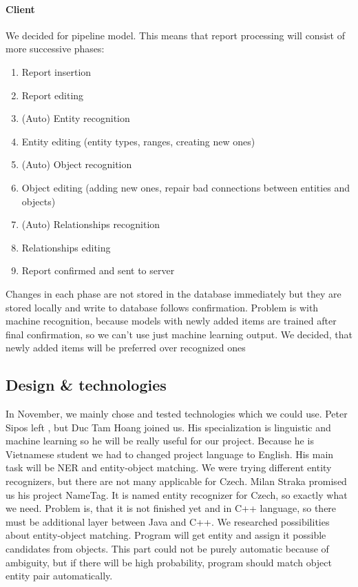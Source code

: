\paragraph{Client}
We decided for pipeline model. This means that report processing will consist of more successive phases:

\begin{enumerate}
\item Report insertion
\item Report editing
\item (Auto) Entity recognition
\item Entity editing (entity types, ranges, creating new ones)
\item (Auto) Object recognition
\item Object editing (adding new ones, repair bad connections between entities and objects)
\item (Auto) Relationships recognition
\item Relationships editing
\item Report confirmed and sent to server
\end{enumerate}

Changes in each phase are not stored in the database immediately but they are
stored locally and write to database follows confirmation. Problem is with
machine recognition, because models with newly added items are trained after final confirmation, so we can't use just machine learning output. We decided, that newly added items will be preferred over recognized ones
 
\subsection{Design \& technologies}
In November, we mainly chose and tested technologies which we could use. Peter
Sipos left \textan{}, but Duc Tam Hoang joined us. His specialization is
linguistic and machine learning so he will be really useful for our project.
Because he is Vietnamese student we had to changed project language to English.
His main task will be NER and entity-object matching. We were trying different
entity recognizers, but there are not many applicable for Czech. Milan Straka
promised us his project NameTag. It is named entity recognizer for Czech, so
exactly what we need. Problem is, that it is not finished yet and in C++
language, so there must be additional layer between Java and C++.
We researched possibilities about entity-object matching. Program will get
entity and assign it possible candidates from objects. This part could not be
purely automatic because of ambiguity, but if there will be high probability,
program should match object entity pair automatically.

